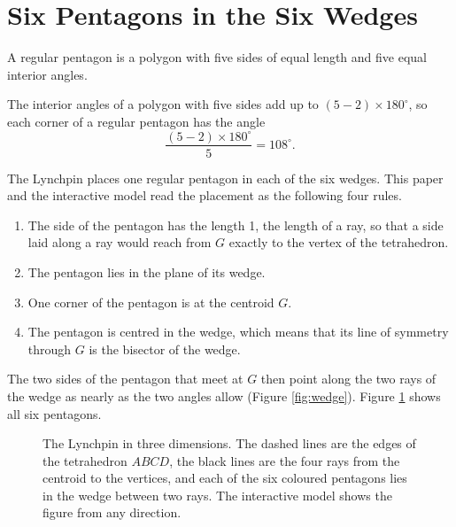 \documentclass[a4paper,12pt]{article}
\begin{document}
\section{Six Pentagons in the Six Wedges}
\label{sec:pentagons}
A regular pentagon is a polygon with five sides of equal length and five equal interior angles.

\begin{center}
\end{center}

\noindent
The interior angles of a polygon with five sides add up to \( (5-2) \times 180^\circ \), so each corner of a regular pentagon has the angle
\[
\frac{(5-2) \times 180^\circ}{5} = 108^\circ .
\]

The Lynchpin places one regular pentagon in each of the six wedges. This paper and the interactive model read the placement as the following four rules.

\begin{enumerate}
\item The side of the pentagon has the length 1, the length of a ray, so that a side laid along a ray would reach from \( G \) exactly to the vertex of the tetrahedron.
\item The pentagon lies in the plane of its wedge.
\item One corner of the pentagon is at the centroid \( G \).
\item The pentagon is centred in the wedge, which means that its line of symmetry through \( G \) is the bisector of the wedge.
\end{enumerate}

\noindent
The two sides of the pentagon that meet at \( G \) then point along the two rays of the wedge as nearly as the two angles allow (Figure \ref{fig:wedge}). Figure \ref{fig:3d-lynchpin} shows all six pentagons.

\begin{figure}[h]
\centering

\caption{The Lynchpin in three dimensions. The dashed lines are the edges of the tetrahedron \( ABCD \), the black lines are the four rays from the centroid to the vertices, and each of the six coloured pentagons lies in the wedge between two rays. The interactive model shows the figure from any direction.}
\label{fig:3d-lynchpin}
\end{figure}
\end{document}
